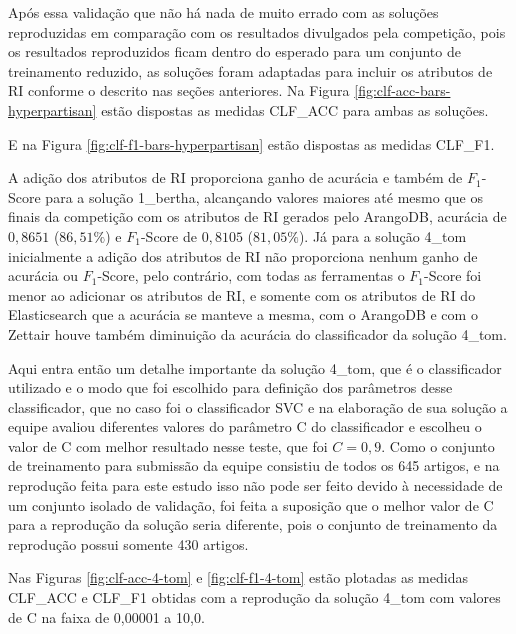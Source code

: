 			Após essa validação que não há nada de muito errado com as soluções reproduzidas em comparação com os resultados divulgados pela competição, pois os resultados reproduzidos ficam dentro do esperado para um conjunto de treinamento reduzido, as soluções foram adaptadas para incluir os atributos de RI conforme o descrito nas seções anteriores.
			Na Figura \ref{fig:clf-acc-bars-hyperpartisan} estão dispostas as medidas CLF\_ACC para ambas as soluções.
			
			

			E na Figura \ref{fig:clf-f1-bars-hyperpartisan} estão dispostas as medidas CLF\_F1.
			
			

			A adição dos atributos de RI proporciona ganho de acurácia e também de $F_1$-Score para a solução 1\_bertha, alcançando valores maiores até mesmo que os finais da competição com os atributos de RI gerados pelo ArangoDB, acurácia de $0,8651$ ($86,51\%$) e $F_1$-Score de $0,8105$ ($81,05\%$).
			Já para a solução 4\_tom inicialmente a adição dos atributos de RI não proporciona nenhum ganho de acurácia ou $F_1$-Score, pelo contrário, com todas as ferramentas o $F_1$-Score foi menor ao adicionar os atributos de RI, e somente com os atributos de RI do Elasticsearch que a acurácia se manteve a mesma, com o ArangoDB e com o Zettair houve também diminuição da acurácia do classificador da solução 4\_tom.

			Aqui entra então um detalhe importante da solução 4\_tom, que é o classificador utilizado e o modo que foi escolhido para definição dos parâmetros desse classificador, que no caso foi o classificador SVC e na elaboração de sua solução a equipe avaliou diferentes valores do parâmetro C do classificador e escolheu o valor de C com melhor resultado nesse teste, que foi $C = 0,9$.
			Como o conjunto de treinamento para submissão da equipe consistiu de todos os 645 artigos, e na reprodução feita para este estudo isso não pode ser feito devido à necessidade de um conjunto isolado de validação, foi feita a suposição que o melhor valor de C para a reprodução da solução seria diferente, pois o conjunto de treinamento da reprodução possui somente 430 artigos.
			
			Nas Figuras \ref{fig:clf-acc-4-tom} e \ref{fig:clf-f1-4-tom} estão plotadas as medidas CLF\_ACC e CLF\_F1 obtidas com a reprodução da solução 4\_tom com valores de C na faixa de 0,00001 a 10,0.
			
